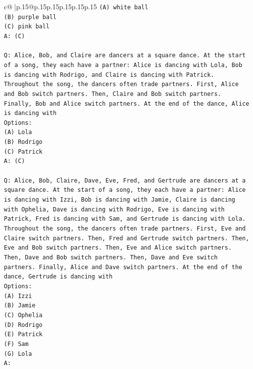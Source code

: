 \documentclass{article}
\begin{document}
{\begin{supertabular}{c@{$\;$}|p{.15\linewidth}@{}p{.15\linewidth}p{.15\linewidth}p{.15\linewidth}p{.15\linewidth}p{.15\linewidth}}
{{{\texttt{(A) white ball} \\
\texttt{(B) purple ball} \\
\texttt{(C) pink ball} \\
\texttt{A: (C)} \\
\\ 
\texttt{Q: Alice, Bob, and Claire are dancers at a square dance. At the start of a song, they each have a partner: Alice is dancing with Lola, Bob is dancing with Rodrigo, and Claire is dancing with Patrick.} \\
\texttt{Throughout the song, the dancers often trade partners. First, Alice and Bob switch partners. Then, Claire and Bob switch partners. Finally, Bob and Alice switch partners. At the end of the dance, Alice is dancing with} \\
\texttt{Options:} \\
\texttt{(A) Lola} \\
\texttt{(B) Rodrigo} \\
\texttt{(C) Patrick} \\
\texttt{A: (C)} \\
\\ 
\texttt{Q: Alice, Bob, Claire, Dave, Eve, Fred, and Gertrude are dancers at a square dance. At the start of a song, they each have a partner: Alice is dancing with Izzi, Bob is dancing with Jamie, Claire is dancing with Ophelia, Dave is dancing with Rodrigo, Eve is dancing with Patrick, Fred is dancing with Sam, and Gertrude is dancing with Lola.} \\
\texttt{Throughout the song, the dancers often trade partners. First, Eve and Claire switch partners. Then, Fred and Gertrude switch partners. Then, Eve and Bob switch partners. Then, Eve and Alice switch partners. Then, Dave and Bob switch partners. Then, Dave and Eve switch partners. Finally, Alice and Dave switch partners. At the end of the dance, Gertrude is dancing with} \\
\texttt{Options:} \\
\texttt{(A) Izzi} \\
\texttt{(B) Jamie} \\
\texttt{(C) Ophelia} \\
\texttt{(D) Rodrigo} \\
\texttt{(E) Patrick} \\
\texttt{(F) Sam} \\
\texttt{(G) Lola} \\
\texttt{A:} \\
            }
        }
    }
     \\ \\


\end{supertabular}}
\end{document}
